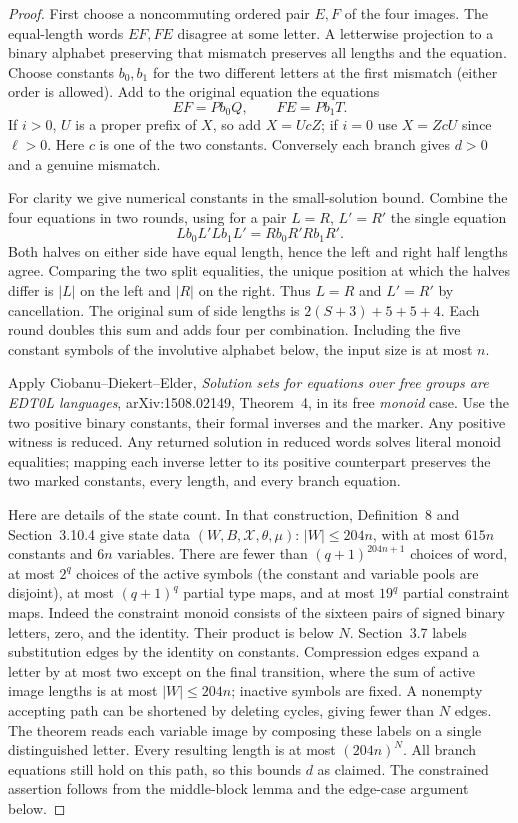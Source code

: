 \begin{proof}
First choose a noncommuting ordered pair $E,F$ of the four images.
The equal-length words $EF,FE$ disagree at some letter. A letterwise
projection to a binary alphabet preserving that mismatch preserves all
lengths and the equation. Choose constants $b_0,b_1$ for the two
different letters at the first mismatch (either order is allowed).
Add to the original equation the equations
\[
 EF=P b_0 Q,\qquad FE=P b_1 T .
\]
If $i>0$, $U$ is a proper prefix of $X$, so add $X=UcZ$;
if $i=0$ use $X=ZcU$ since $\ell>0$. Here $c$ is one of the two
constants. Conversely each branch gives $d>0$ and a genuine mismatch.

For clarity we give numerical constants in the small-solution bound.
Combine the four equations in two rounds, using for a pair
$L=R$, $L'=R'$ the single equation
\[
 L b_0 L' L b_1 L'=R b_0 R' R b_1 R'.
\]
Both halves on either side have equal length, hence the left and right
half lengths agree. Comparing the two split equalities, the unique
position at which the halves differ is $|L|$ on the left and $|R|$
on the right. Thus $L=R$ and $L'=R'$ by cancellation. The original
sum of side lengths is $2(S+3)+5+5+4$. Each round doubles this
sum and adds four per combination. Including the five constant
symbols of the involutive alphabet below, the input size is at most $n$.

Apply Ciobanu--Diekert--Elder, \emph{Solution sets for equations over
free groups are EDT0L languages}, arXiv:1508.02149, Theorem~4,
in its free \emph{monoid} case. Use the two positive binary constants,
their formal inverses and the marker. Any positive witness is reduced.
Any returned solution in reduced words solves literal monoid equalities;
mapping each inverse letter to its positive counterpart preserves the two
marked constants, every length, and every branch equation.

Here are details of the state count. In that construction, Definition~8
and Section~3.10.4 give state data $(W,B,\mathcal X,\theta,\mu)$:
$|W|\le204n$, with at most $615n$ constants and $6n$ variables.
There are fewer than $(q+1)^{204n+1}$ choices of word, at most $2^q$
choices of the active symbols (the constant and variable pools are
disjoint), at most $(q+1)^q$ partial type maps, and at most $19^q$
partial constraint maps. Indeed the constraint monoid consists of the
sixteen pairs of signed binary letters, zero, and the identity.
Their product is below $N$. Section~3.7 labels substitution edges by the
identity on constants. Compression edges expand a letter by at most two
except on the final transition, where the sum of active image lengths
is at most $|W|\le204n$; inactive symbols are fixed.
A nonempty accepting path can be shortened by deleting cycles, giving
fewer than $N$ edges. The theorem reads each variable image by composing
these labels on a single distinguished letter. Every resulting length
is at most $(204n)^N$. All branch equations still hold on this path,
so this bounds $d$ as claimed. The constrained assertion follows from
the middle-block lemma and the edge-case argument below.
\end{proof}

